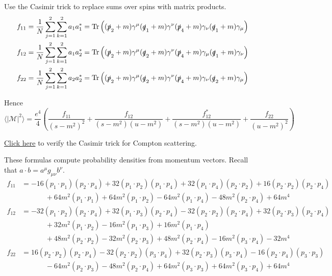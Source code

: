 \documentclass[12pt]{article}
\begin{document}
\noindent
Use the Casimir trick to replace sums over spins with matrix products.
\begin{align*}
f_{11}&=\frac{1}{N} \sum_{j=1}^2\sum_{k=1}^2 a_1a_1^*=\mathop{\rm Tr}
\left(
(\slashed{p}_2+m)\gamma^\mu(\slashed{q}_1+m)\gamma^\nu(\slashed{p}_4+m)\gamma_\nu(\slashed{q}_1+m)\gamma_\mu
\right)
\\
f_{12}&=\frac{1}{N} \sum_{j=1}^2\sum_{k=1}^2 a_1a_2^*=\mathop{\rm Tr}
\left(
(\slashed{p}_2+m)\gamma^\mu(\slashed{q}_2+m)\gamma^\nu(\slashed{p}_4+m)\gamma_\mu(\slashed{q}_1+m)\gamma_\nu
\right)
\\
f_{22}&=\frac{1}{N} \sum_{j=1}^2\sum_{k=1}^2 a_2a_2^*=\mathop{\rm Tr}
\left(
(\slashed{p}_2+m)\gamma^\mu(\slashed{q}_2+m)\gamma^\nu(\slashed{p}_4+m)\gamma_\nu(\slashed{q}_2+m)\gamma_\mu
\right)
\end{align*}

\noindent
Hence
\begin{equation}
\langle|\mathcal{M}|^2\rangle
=
\frac{e^4}{4}
\left(
\frac{f_{11}}{(s-m^2)^2}
+\frac{f_{12}}{(s-m^2)(u-m^2)}
+\frac{f_{12}^*}{(s-m^2)(u-m^2)}
+\frac{f_{22}}{(u-m^2)^2}
\right)
\end{equation}

\noindent
\href{https://georgeweigt.github.io/compton-scattering-1.html}{Click here}
to verify the Casimir trick for Compton scattering.

\bigskip
\noindent
These formulas compute probability densities from momentum vectors.
Recall that $a\cdot b=a^\mu g_{\mu\nu}b^\nu$.
\begin{align*}
f_{11}&=
-16 (p_1 \cdot p_1) (p_2 \cdot p_4) +
 32 (p_1 \cdot p_2) (p_1 \cdot p_4) +
 32 (p_1 \cdot p_4) (p_2 \cdot p_2) +
 16 (p_2 \cdot p_2) (p_2 \cdot p_4) %
\\ &\phantom{=}\qquad{}+
 64 m^2 (p_1 \cdot p_1) +
 64 m^2 (p_1 \cdot p_2) -
 64 m^2 (p_1 \cdot p_4) -
 48 m^2 (p_2 \cdot p_4) + 64 m^4
\\
f_{12}&=
-32 (p_1 \cdot p_2) (p_2 \cdot p_4) +
 32 (p_1 \cdot p_3) (p_2 \cdot p_4) -
 32 (p_2 \cdot p_2) (p_2 \cdot p_4) +
 32 (p_2 \cdot p_3) (p_2 \cdot p_4) %
 \\ &\phantom{=}\qquad{}+
 32 m^2 (p_1 \cdot p_2) -
 16 m^2 (p_1 \cdot p_3) +
 16 m^2 (p_1 \cdot p_4) %
 \\ &\phantom{=}\qquad{}+
 48 m^2 (p_2 \cdot p_2) -
 32 m^2 (p_2 \cdot p_3) +
 48 m^2 (p_2 \cdot p_4) -
 16 m^2 (p_3 \cdot p_4) - 32 m^4
\\
f_{22}&=
16 (p_2 \cdot p_2) (p_2 \cdot p_4) -
32 (p_2 \cdot p_2) (p_3 \cdot p_4) +
32 (p_2 \cdot p_3) (p_3 \cdot p_4) -
16 (p_2 \cdot p_4) (p_3 \cdot p_3) %
\\ &\phantom{=}\qquad{}-
64 m^2 (p_2 \cdot p_3) -
48 m^2 (p_2 \cdot p_4) +
64 m^2 (p_3 \cdot p_3) +
64 m^2 (p_3 \cdot p_4) + 64 m^4
\end{align*}
\end{document}

